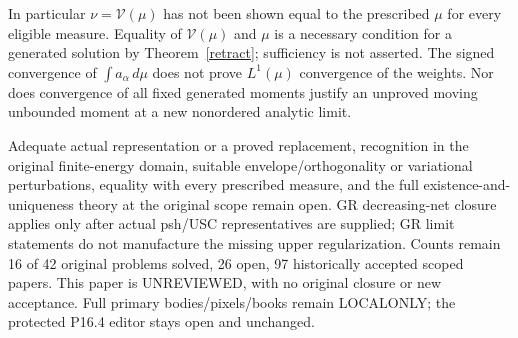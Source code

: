 \documentclass[11pt]{article}
\begin{document}
In particular $\nu=\mathcal V(\mu)$ has not been shown equal to
the prescribed $\mu$ for every eligible measure. Equality of
$\mathcal V(\mu)$ and $\mu$ is a necessary condition for a generated
solution by Theorem~\ref{retract}; sufficiency is not asserted.
The signed convergence of $\int a_\alpha\,d\mu$ does not prove
$L^1(\mu)$ convergence of the weights. Nor does convergence of all
fixed generated moments justify an unproved moving unbounded moment
at a new nonordered analytic limit.

Adequate actual representation or a proved replacement, recognition
in the original finite-energy domain, suitable envelope/orthogonality
or variational perturbations, equality with every prescribed measure,
and the full existence-and-uniqueness theory at the original scope
remain open. GR decreasing-net closure applies only after actual
psh/USC representatives are supplied; GR limit statements do not
manufacture the missing upper regularization. Counts remain
16 of 42 original problems solved, 26 open, 97 historically accepted
scoped papers. This paper is UNREVIEWED, with no original closure
or new acceptance. Full primary bodies/pixels/books remain LOCALONLY;
the protected P16.4 editor stays open and unchanged.
\end{document}
